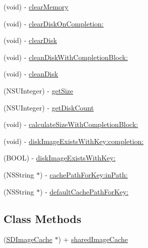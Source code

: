 \begin{DoxyCompactItemize}
\item 
(void) -\/ \hyperlink{interface_s_d_image_cache_a931b161c379dd952affffe8c0544527d}{clear\+Memory}
\item 
(void) -\/ \hyperlink{interface_s_d_image_cache_ab936a83a1b711209d30f9051cc3658cc}{clear\+Disk\+On\+Completion\+:}
\item 
(void) -\/ \hyperlink{interface_s_d_image_cache_a2a9bcc872d749959df5dd458247b3301}{clear\+Disk}
\item 
(void) -\/ \hyperlink{interface_s_d_image_cache_a1f82c522f4cb0fafdb063291cbcb23d0}{clean\+Disk\+With\+Completion\+Block\+:}
\item 
(void) -\/ \hyperlink{interface_s_d_image_cache_a491f75cc5c1df37dce478c00f898a0d8}{clean\+Disk}
\item 
(N\+S\+U\+Integer) -\/ \hyperlink{interface_s_d_image_cache_a934d85543e92fdb3ac35cbdff3e668d3}{get\+Size}
\item 
(N\+S\+U\+Integer) -\/ \hyperlink{interface_s_d_image_cache_abc59ee03f3afc7d9fa202a0790f8b5c0}{get\+Disk\+Count}
\item 
(void) -\/ \hyperlink{interface_s_d_image_cache_a276a37cdab08d116906f65040bad9c99}{calculate\+Size\+With\+Completion\+Block\+:}
\item 
(void) -\/ \hyperlink{interface_s_d_image_cache_a8de2e0e5aea556048957eb34a30bdd02}{disk\+Image\+Exists\+With\+Key\+:completion\+:}
\item 
(B\+O\+O\+L) -\/ \hyperlink{interface_s_d_image_cache_a67feea7b5568f427dfcf4f380abc1ba7}{disk\+Image\+Exists\+With\+Key\+:}
\item 
(N\+S\+String $\ast$) -\/ \hyperlink{interface_s_d_image_cache_ae1de10e873f845c01509585b3e1716a3}{cache\+Path\+For\+Key\+:in\+Path\+:}
\item 
(N\+S\+String $\ast$) -\/ \hyperlink{interface_s_d_image_cache_a591ff2cb8bcd813969b33c610c569bdc}{default\+Cache\+Path\+For\+Key\+:}
\end{DoxyCompactItemize}
\subsection*{Class Methods}
\begin{DoxyCompactItemize}
\item 
(\hyperlink{interface_s_d_image_cache}{S\+D\+Image\+Cache} $\ast$) + \hyperlink{interface_s_d_image_cache_a3a622a32640d15bf01e873275ea1e95e}{shared\+Image\+Cache}
\end{DoxyCompactItemize}
